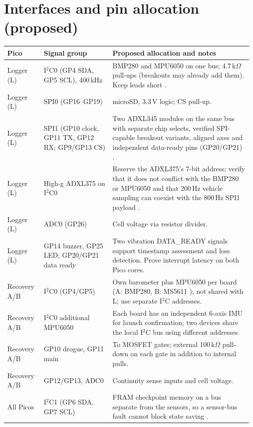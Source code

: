 \section{Interfaces and pin allocation (proposed)}
\small
\begingroup
{}
\begin{tabularx}{\linewidth}{@{}L{22mm}L{40mm}Y@{}}
\toprule{}\textbf{Pico}&\textbf{Signal group}&\textbf{Proposed allocation and notes}\\\midrule
Logger (L) & I$^2$C0 (GP4 SDA, GP5 SCL), 400\,kHz & BMP280 and MPU6050 on one bus; 4.7\,k$\Omega$ pull-ups (breakouts may already add them). Keep leads short \cite{i2cspec}.\\
Logger (L) & SPI0 (GP16--GP19) & microSD, 3.3\,V logic; CS pull-up.\\
Logger (L) & SPI1 (GP10 clock, GP11 TX, GP12 RX; GP9/GP13 CS) & Two ADXL345 modules on the same bus with separate chip selects, verified SPI-capable breakout variants, aligned axes and independent data-ready pins (GP20/GP21) \cite{adxl345ds}.\\
Logger (L) & High-g ADXL375 on I$^2$C0 & Reserve the ADXL375's 7-bit address; verify that it does not conflict with the BMP280 or MPU6050 and that 200\,Hz vehicle sampling can coexist with the 800\,Hz SPI1 payload \cite{adxl375ds}.\\
Logger (L) & ADC0 (GP26) & Cell voltage via resistor divider.\\
Logger (L) & GP14 buzzer, GP25 LED; GP20/GP21 data ready & Two vibration DATA\_READY signals support timestamp assessment and loss detection. Prove interrupt latency on both Pico cores.\\
Recovery A/B & I$^2$C0 (GP4/GP5) & Own barometer plus MPU6050 per board (A: BMP280, B: MS5611 \cite{ms5611ds,mpu6050ds}); not shared with L; use separate I$^2$C addresses.\\
Recovery A/B & I$^2$C0 additional MPU6050 & Each board has an independent 6-axis IMU for launch confirmation; two devices share the local I$^2$C bus using different addresses.\\
Recovery A/B & GP10 drogue, GP11 main & To MOSFET gates; external 100\,k$\Omega$ pull-down on each gate in addition to internal pulls.\\
Recovery A/B & GP12/GP13, ADC0 & Continuity sense inputs and cell voltage.\\
All Picos & I$^2$C1 (GP6 SDA, GP7 SCL) & FRAM checkpoint memory on a bus separate from the sensors, so a sensor-bus fault cannot block state saving \cite{fram}.\\
\bottomrule
\end{tabularx}
\endgroup %
\normalsize

